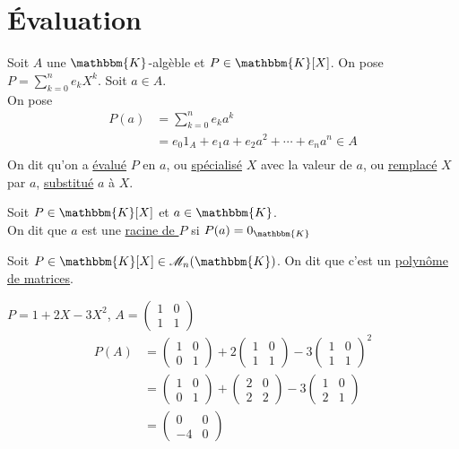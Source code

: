 \part{\'Evaluation}

\begin{defn}
	Soit $A$ une $\mathbbm{K}$-algèble et $P \in \mathbbm{K}[X]$. On pose $P =  \sum_{k=0}^n e_k X^k$. Soit $a \in A$.\\
	On pose
	\begin{align*}
		P(a) &= \sum_{k=0}^n e_k a^k\\
		&= e_0 1_A + e_1 a + e_2 a^2 + \cdots + e_n a^n \in A \\
	\end{align*}
	On dit qu'on a \underline{évalué} $P$ en $a$, ou \underline{spécialisé} $X$ avec la valeur de $a$, ou \underline{remplacé} $X$ par $a$, \underline{substitué} $a$ à $X$.
\end{defn}

\begin{defn}
	Soit $P \in \mathbbm{K}[X]$ et $a \in \mathbbm{K}$. \\
	On dit que $a$ est une \underline{racine de $P$} si $P(a) = 0_{\mathbbm{K}}$
\end{defn}

\begin{defn}
	Soit $P \in \mathbbm{K}[X] \in \mathcal{M}_n(\mathbbm{K})$. On dit que c'est un \underline{polynôme de matrices}.
\end{defn}

\begin{exm}
	$P = 1+2X - 3X^2$, $A = \begin{pmatrix}
		1&0\\
		1&1
	\end{pmatrix}$ 
	\begin{align*}
		P(A) &= \begin{pmatrix}
			1&0\\
			0&1
		\end{pmatrix} + 2\begin{pmatrix}
			1&0\\
			1&1
		\end{pmatrix} - 3 \begin{pmatrix}
			1&0\\
			1&1
		\end{pmatrix}^2 \\
		&= \begin{pmatrix}
			1&0\\
			0&1
		\end{pmatrix} + \begin{pmatrix}
			2&0\\
			2&2
		\end{pmatrix} - 3 \begin{pmatrix}
			1&0\\
			2&1
		\end{pmatrix} \\
		&= \begin{pmatrix}
			0&0\\
			-4&0
		\end{pmatrix} \\
	\end{align*}
\end{exm}


